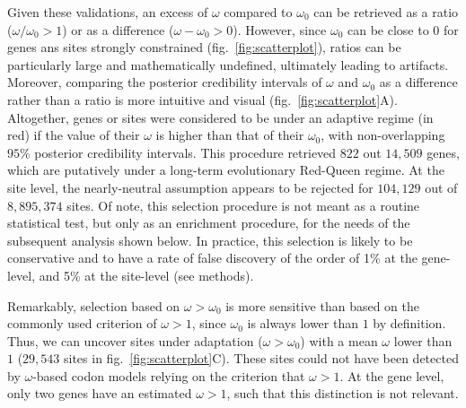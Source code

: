 \documentclass{article}
\begin{document}
    Given these validations, an excess of $\omega$ compared to $\omega_{0}$ can be retrieved as a ratio ($\omega / \omega_{0} > 1$) or as a difference ($\omega - \omega_{0}>0$).
    However, since $\omega_{0}$ can be close to $0$ for genes ans sites strongly constrained (fig.~\ref{fig:scatterplot}), ratios can be particularly large and mathematically undefined, ultimately leading to artifacts.
    Moreover, comparing the posterior credibility intervals of $\omega$ and $\omega_{0}$ as a difference rather than a ratio is more intuitive and visual (fig.~\ref{fig:scatterplot}A).
    Altogether, genes or sites were considered to be under an adaptive regime (in red) if the value of their $\omega$ is higher than that of their $\omega_{0}$, with non-overlapping $95\%$ posterior credibility intervals.
    This procedure retrieved $822$ out $14,509$ genes, which are putatively under a long-term evolutionary Red-Queen regime.
    At the site level, the nearly-neutral assumption appears to be rejected for $104,129$ out of $8,895,374$ sites.
    Of note, this selection procedure is not meant as a routine statistical test, but only as an enrichment procedure, for the needs of the subsequent analysis shown below.
    In practice, this selection is likely to be conservative and to have a rate of false discovery of the order of 1\% at the gene-level, and 5\% at the site-level (see methods).

    Remarkably, selection based on $\omega>\omega_{0}$ is more sensitive than based on the commonly used criterion of $\omega>1$, since $\omega_{0}$ is always lower than $1$ by definition\cite{spielman_relationship_2015}.
    Thus, we can uncover sites under adaptation ($\omega>\omega_{0}$) with a mean $\omega$ lower than $1$ ($29,543$ sites in fig.~\ref{fig:scatterplot}C).
    These sites could not have been detected by $\omega$-based codon models relying on the criterion that $\omega>1$.
    At the gene level, only two genes have an estimated $\omega > 1$, such that this distinction is not relevant.
\end{document}
